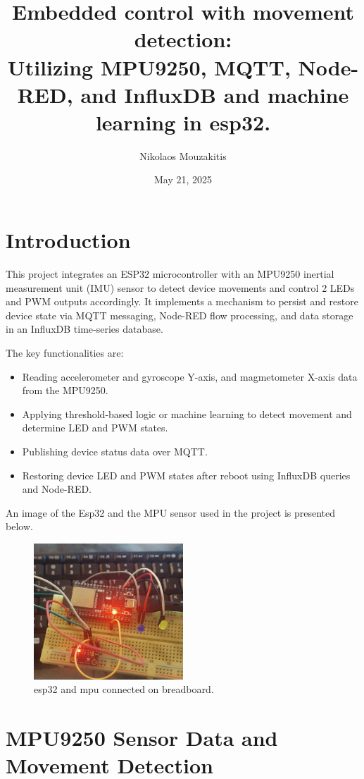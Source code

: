 \documentclass[a4paper,12pt]{article}
\title{Embedded control with movement detection: \\ Utilizing MPU9250, MQTT, Node-RED, and InfluxDB and machine learning in esp32.}
\author{Nikolaos Mouzakitis}
\date{May 21, 2025}
\begin{document}
\maketitle

\section{Introduction}

This project integrates an ESP32 microcontroller with an MPU9250 
inertial measurement unit (IMU) sensor to detect device movements 
and control 2 LEDs and PWM outputs accordingly. 
It implements a mechanism to persist and restore device state 
via MQTT messaging, Node-RED flow processing, and data storage in an InfluxDB time-series database.

The key 
functionalities are:

\begin{itemize}
    \item Reading accelerometer and gyroscope Y-axis, and magmetometer X-axis data from the MPU9250.
    \item Applying threshold-based logic or machine learning to detect movement and determine LED and PWM states.
    \item Publishing device status data over MQTT.
    \item Restoring device LED and PWM states after reboot using InfluxDB queries and Node-RED.
\end{itemize}


An image of the Esp32 and the MPU sensor used in the project is presented below.
		\begin{figure}[H]
			\centering
			\includegraphics[width=0.5\textwidth]{con.jpeg}
			\caption{esp32 and mpu connected on breadboard.}
			\label{fig1:}
		\end{figure}		




\section{MPU9250 Sensor Data and Movement Detection}
\end{document}
